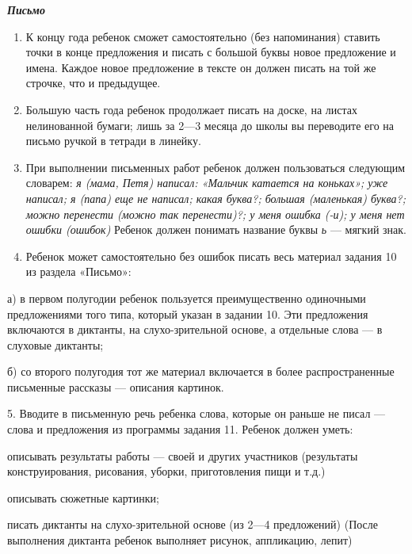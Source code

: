 \documentclass[a5paper]{book}
\renewcommand{\emph}[1]{\textit{#1}}
\begin{document}
\emph{\textbf{Письмо}}


\begin{enumerate}
\def\labelenumi{\arabic{enumi}.}
\item
  
  К концу года ребенок сможет самостоятельно (без напоминания) ставить
  точки в конце предложения и писать с большой буквы новое предложение и
  имена. Каждое новое предложение в тексте он должен писать на той же
  строчке, что и предыдущее.
  
\item
  
  Большую часть года ребенок продолжает писать на доске, на листах
  нелинованной бумаги; лишь за 2---3 месяца до школы вы переводите его
  на письмо ручкой в тетради в линейку.
  
\item
  
  При выполнении письменных работ ребенок должен пользоваться следующим
  словарем: \emph{я (мама, Петя) написал: «Мальчик катается на коньках»;
  уже написал; я (папа) еще не написал; какая буква?; большая
  (маленькая) буква?; можно перенести (можно так перенести)?; у меня
  ошибка (-и); у меня нет ошибки (ошибок)} Ребенок должен понимать
  название буквы \emph{ь} --- мягкий знак.
  
\item
  
  Ребенок может самостоятельно без ошибок писать весь материал задания
  10 из раздела «Письмо»:
  
\end{enumerate}


а) в первом полугодии ребенок пользуется преимущественно одиночными
предложениями того типа, который указан в задании 10. Эти предложения
включаются в диктанты, на слухо-зрительной основе, а отдельные слова ---
в слуховые диктанты;

б) со второго полугодия тот же материал включается в более
распространенные письменные рассказы --- описания картинок.

5. Вводите в письменную речь ребенка слова, которые он раньше не писал
--- слова и предложения из программы задания 11. Ребенок должен уметь:

описывать результаты работы --- своей и других участников (результаты
конструирования, рисования, уборки, приготовления пищи и т.д.)

описывать сюжетные картинки;

писать диктанты на слухо-зрительной основе (из 2---4 предложений) (После
выполнения диктанта ребенок выполняет рисунок, аппликацию, лепит)
\end{document}
